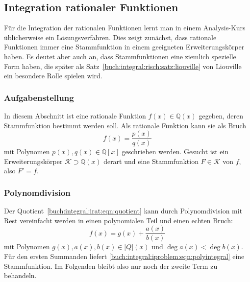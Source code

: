 %
%
%
\subsection{Integration rationaler Funktionen
\label{buch:integral:subsection:rationalefunktionen}}
Für die Integration der rationalen Funktionen lernt man in einem
Analysis-Kurs üblicherweise ein Lösungsverfahren.
Dies zeigt zunächst, dass rationale Funktionen immer eine Stammfunktion
in einem geeigneten Erweiterungskörper haben.
Es deutet aber auch an, dass Stammfunktionen eine ziemlich spezielle
Form haben, die später als
Satz~\ref{buch:integral:risch:satz:liouville} von Liouville
ein besondere Rolle spielen wird.

%
%
\subsubsection{Aufgabenstellung}
In diesem Abschnitt ist eine rationale Funktion $f(x)\in\mathbb{Q}(x)$
gegeben, deren Stammfunktion bestimmt werden soll.
Als rationale Funktion kann sie als Bruch
\begin{equation}
f(x) = \frac{p(x)}{q(x)}
\label{buch:integral:irat:eqn:quotient}
\end{equation}
mit Polynomen $p(x),q(x)\in\mathbb{Q}[x]$ geschrieben werden.
Gesucht ist ein Erweiterungskörper $\mathscr{K}\supset \mathbb{Q}(x)$ 
derart und eine Stammfunktion $F\in\mathscr{K}$ von $f$, also $F'=f$.

%
%
\subsubsection{Polynomdivision}
Der Quotient~\eqref{buch:integral:irat:eqn:quotient} kann durch Polynomdivision
mit Rest vereinfacht werden in einen polynomialen Teil und einen echten
Bruch:
\begin{equation}
f(x)
=
g(x)
+
\frac{a(x)}{b(x)}
\label{buch:integral:irat:eqn:polydiv}
\end{equation}
mit Polynomen $g(x),a(x),b(x)\in\mathbb[Q](x)$ und $\deg a(x) < \deg b(x)$.
Für den ersten Summanden liefert
\eqref{buch:integral:iproblem:eqn:polyintegral} eine Stammfunktion.
Im Folgenden bleibt also nur noch der zweite Term zu behandeln.

%
%
